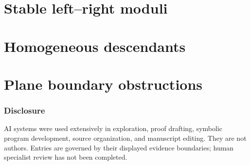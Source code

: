 \documentclass[11pt]{amsart}
\begin{document}
\part{Stable left--right moduli}


\part{Homogeneous descendants}


\part{Plane boundary obstructions}


\section*{Disclosure}

AI systems were used extensively in exploration, proof drafting, symbolic
program development, source organization, and manuscript editing.  They are
not authors.  Entries are governed by their displayed evidence boundaries;
human specialist review has not been completed.
\end{document}
